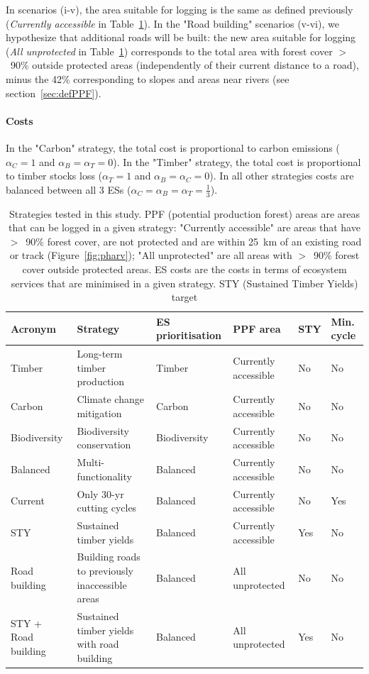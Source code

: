 \documentclass{article}
\begin{document}
In scenarios (i-v), the area suitable for logging is the same as defined previously (\textit{Currently accessible} in Table~\ref{tab:strategies}). In the "Road building" scenarios (v-vi), we hypothesize that additional roads will be built: the new area suitable for logging (\textit{All unprotected} in Table~\ref{tab:strategies}) corresponds to the total area with forest cover $>$~90\% outside protected areas (independently of their current distance to a road), minus the 42\% corresponding to slopes and areas near rivers (see section~\ref{sec:defPPF}). 

\paragraph{Costs}

In the "Carbon" strategy, the total cost is proportional to carbon emissions ($\alpha_C=1$ and $\alpha_B=\alpha_T=0$). In the "Timber" strategy, the total cost is proportional to timber stocks loss ($\alpha_T=1$ and $\alpha_B=\alpha_C=0$). In all other strategies costs are balanced between all 3 ESs ($\alpha_C=\alpha_B=\alpha_T=\frac{1}{3}$).

\begin{table}
    \centering
    \begin{tabularx}{\textwidth}{p{2cm} p{4.5cm} p{2cm} p{3.5cm} p{0.8cm} p{1cm}}
    \toprule
         Acronym & Strategy & ES prioritisation & PPF area &  STY & Min. cycle \\
         \midrule
         Timber & Long-term timber production & Timber  & Currently accessible & No & No\\
         Carbon & Climate change mitigation &  Carbon & Currently accessible & No & No\\
         Biodiversity & Biodiversity conservation &  Biodiversity & Currently accessible & No & No\\
         Balanced & Multi-functionality & Balanced & Currently accessible & No & No \\
         Current & Only 30-yr cutting cycles & Balanced & Currently accessible & No & Yes \\
         STY & Sustained timber yields & Balanced & Currently accessible & Yes & No \\
         Road building & Building roads to previously inaccessible areas & Balanced & All unprotected & No & No \\
         STY + Road building & Sustained timber yields with road building & Balanced & All unprotected & Yes & No \\
         \bottomrule
    \end{tabularx}
    \caption{Strategies tested in this study. PPF (potential production forest) areas are areas that can be logged in a given strategy: "Currently accessible" are areas that have $>$~90\% forest cover, are not protected and are within 25~km of an existing road or track (Figure~\ref{fig:pharv}); "All unprotected" are all areas with $>$~90\% forest cover outside protected areas. ES costs are the costs in terms of ecosystem services that are minimised in a given strategy. STY (Sustained Timber Yields) target }
    \label{tab:strategies}
\end{table}
\end{document}
